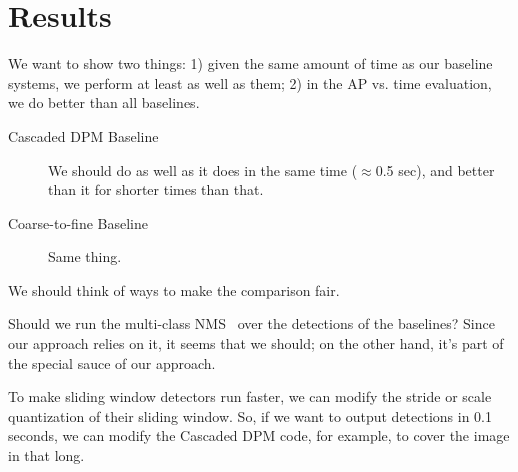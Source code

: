 \section{Results}

We want to show two things: 1) given the same amount of time as our baseline systems, we perform at least as well as them; 2) in the AP vs. time evaluation, we do better than all baselines.

\begin{description}
  \item[Cascaded DPM Baseline~\cite{Felzenszwalb2010b}] We should do as well as it does in the same time ($\approx$0.5 sec), and better than it for shorter times than that.
  \item[Coarse-to-fine Baseline~\cite{Pedersoli2011}] Same thing.
\end{description}

We should think of ways to make the comparison fair.

Should we run the multi-class NMS~\cite{Desai2009} over the detections of the baselines?
Since our approach relies on it, it seems that we should; on the other hand, it's part of the special sauce of our approach.

To make sliding window detectors run faster, we can modify the stride or scale quantization of their sliding window.
So, if we want to output detections in 0.1 seconds, we can modify the Cascaded DPM code, for example, to cover the image in that long.

